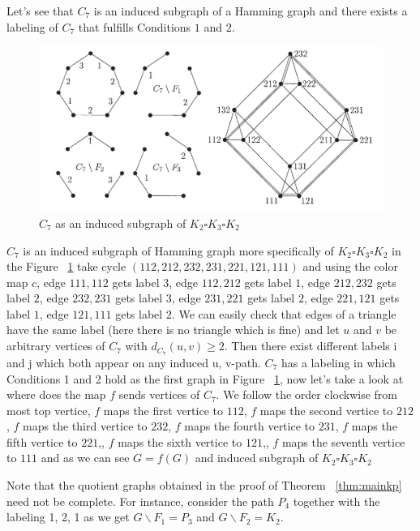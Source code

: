 \documentclass[12pt,a4paper,titlepage,openany]{report}
\begin{document}
\begin{example} Let's see that $C_7$ is an induced subgraph of a Hamming graph and there exists a labeling of $C_7$ that fulfills Conditions $1$ and $2$.
\begin{figure}[h!]
\begin{center}
\includegraphics[width=1\linewidth]{figures/c_7inducedhamming.png}
\end{center}
\caption{$C_7$ as an induced subgraph of $K_2\square K_3\square K_2$}\label{fig:c7induced}
\end{figure}
\newline
$C_7$ is an induced subgraph of Hamming graph more specifically of $K_2\square K_3\square K_2$ in the Figure ~\ref{fig:c7induced} take cycle $(112,212,232,231,221,121,111)$ and using the color map $c$, edge $111,112$ gets label $3$, edge $112,212$ gets label $1$, edge $212,232$ gets label $2$, edge $232,231$ gets label $3$, edge $231,221$ gets label $2$, edge $221,121$ gets label $1$, edge $121,111$ gets label $2$. We can easily check that edges of a triangle have the same label (here there is no triangle which is fine) and let $u$ and $v$ be arbitrary vertices of $C_7$ with $d_{C_7}(u,v) \geq 2$. Then there exist different labels i and j which both appear on any induced u, v-path.\newline
$C_7$ has a labeling in which Conditions 1 and 2 hold as the first graph in Figure ~\ref{fig:c7induced}, now let's take a look at where does the map $f$ sends vertices of $C_7$. We follow the order clockwise from most top vertice, $f$ maps the first vertice to $112$, $f$ maps the second vertice to $212$, $f$ maps the third vertice to $232$, $f$ maps the fourth vertice to $231$, $f$ maps the fifth vertice to $221$,, $f$ maps the sixth vertice to $121$,, $f$ maps the seventh vertice to $111$ and as we can see $G=f(G)$ and induced subgraph of $K_2\square K_3\square K_2$
\end{example}
Note that the quotient graphs obtained in the proof of Theorem ~\ref{thm:mainkp} need not be complete. For instance, consider the path $P_4$ together with the labeling 1, 2, 1 as we get $G\backslash F_1=P_3$ and $G\backslash F_2=K_2$.
\end{document}
